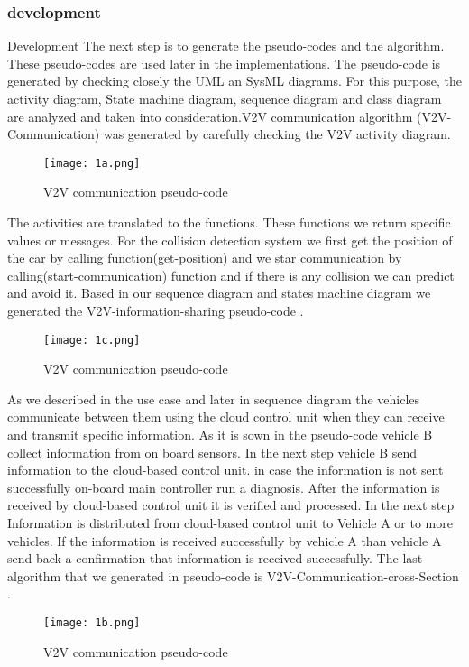 \documentclass[conference]{IEEEtran}
\begin{document}
\subsubsection{development}
Development
The next step is to generate the pseudo-codes and the algorithm. These pseudo-codes are used later in the implementations. The pseudo-code is generated by checking closely the UML an SysML diagrams. For this purpose, the activity diagram, State machine diagram, sequence diagram and class diagram are analyzed and taken into consideration.V2V communication algorithm (V2V-Communication) was generated by carefully checking the V2V activity diagram.
\begin{figure}[htp]
    \centering
     \texttt{[image: 1a.png]}
    \caption{V2V communication pseudo-code }
    \label{fig:reg-gen}
\end{figure}
The activities are translated to the functions. These functions we return specific values or messages. For the collision detection system we first get the position of the car by calling function(get-position) and we star communication by calling(start-communication) function and if there is any collision we can predict and avoid it. Based in our sequence diagram and states machine diagram we generated the V2V-information-sharing  pseudo-code . 
\begin{figure}[htp]
    \centering
     \texttt{[image: 1c.png]}
    \caption{V2V communication pseudo-code }
    \label{fig:reg-gen}
\end{figure}
As we described in the use case and later in sequence diagram the vehicles communicate between them using the cloud control unit when they can receive and transmit specific information. As it is sown in the pseudo-code vehicle B collect information from on board sensors. In the next step vehicle B send information to the cloud-based control unit. in case the information is not sent successfully on-board main controller run a diagnosis. After the information is received by cloud-based control unit it is verified and processed. In the next step Information is distributed from cloud-based control unit to Vehicle A or to more vehicles. If the information is received successfully by vehicle A than vehicle A send back a confirmation that information is received successfully. The last algorithm that we generated in pseudo-code is V2V-Communication-cross-Section .
\begin{figure}[htp]
    \centering
     \texttt{[image: 1b.png]}
    \caption{V2V communication pseudo-code }
    \label{fig:reg-gen}
\end{figure}
\end{document}
